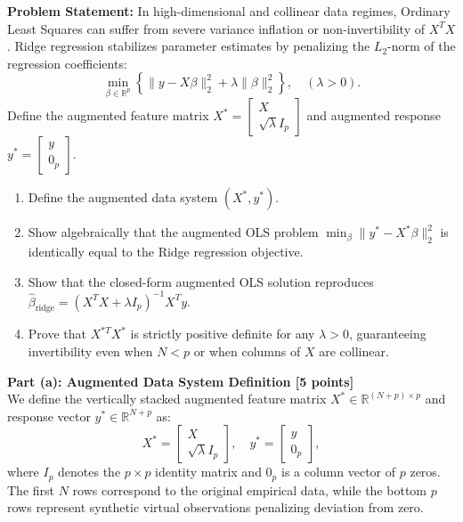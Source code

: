 \documentclass[11pt,a4paper]{article}
\begin{document}
\textbf{Problem Statement:}
In high-dimensional and collinear data regimes, Ordinary Least Squares can suffer from severe variance inflation or non-invertibility of $X^T X$. Ridge regression stabilizes parameter estimates by penalizing the $L_2$-norm of the regression coefficients:
\[
  \min_{\beta \in \mathbb{R}^p} \left\{ \|y - X\beta\|_2^2 + \lambda \|\beta\|_2^2 \right\}, \quad (\lambda > 0).
\]
Define the augmented feature matrix $X^* = \begin{bmatrix} X \\ \sqrt{\lambda} I_p \end{bmatrix}$ and augmented response $y^* = \begin{bmatrix} y \\ 0_p \end{bmatrix}$.
\begin{enumerate}[label=(\alph*), itemsep=3pt, leftmargin=18pt]
  \item Define the augmented data system $(X^*, y^*)$.
  \item Show algebraically that the augmented OLS problem $\min_\beta \|y^* - X^* \beta\|_2^2$ is identically equal to the Ridge regression objective.
  \item Show that the closed-form augmented OLS solution reproduces $\hat{\beta}_{\text{ridge}} = (X^T X + \lambda I_p)^{-1} X^T y$.
  \item Prove that $X^{*T} X^*$ is strictly positive definite for any $\lambda > 0$, guaranteeing invertibility even when $N < p$ or when columns of $X$ are collinear.
\end{enumerate}

\vspace{8pt}
\noindent{\large\bfseries\textcolor{utblue}{Solution:}}
\vspace{4pt}

\textbf{Part (a): Augmented Data System Definition [5 points]} \\
We define the vertically stacked augmented feature matrix $X^* \in \mathbb{R}^{(N+p) \times p}$ and response vector $y^* \in \mathbb{R}^{N+p}$ as:
\[
  X^* = \begin{bmatrix} X \\ \sqrt{\lambda} I_p \end{bmatrix}, \quad y^* = \begin{bmatrix} y \\ 0_p \end{bmatrix},
\]
where $I_p$ denotes the $p \times p$ identity matrix and $0_p$ is a column vector of $p$ zeros. The first $N$ rows correspond to the original empirical data, while the bottom $p$ rows represent synthetic virtual observations penalizing deviation from zero.
\end{document}
